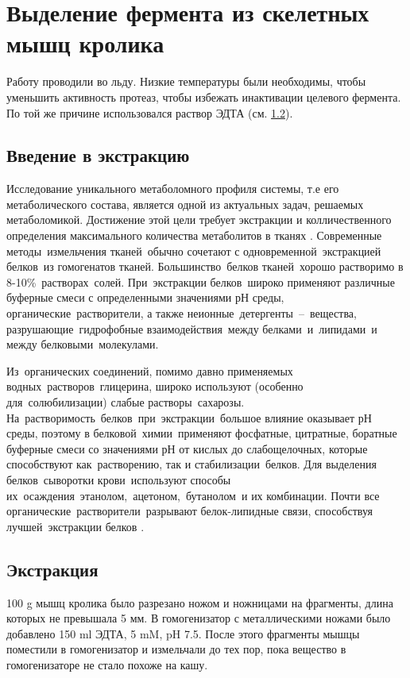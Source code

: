 \section{Выделение фермента из скелетных мышц кролика}
Работу проводили во льду.
Низкие температуры были необходимы, чтобы уменьшить активность протеаз,
чтобы избежать инактивации целевого фермента.
По той же причине использовался раствор ЭДТА (см. \ref{extr}).

\subsection{Введение в экстракцию}
Исследование уникального метаболомного профиля системы, т.е его метаболического состава, является одной из
актуальных задач, решаемых метаболомикой.
Достижение этой цели требует экстракции и колличественного определения максимального количества
метаболитов в тканях \cite{kursovaya-garika}.
Современные методы измельчения тканей обычно сочетают с одновременной экстракцией белков из гомогенатов
тканей.
Большинство белков тканей хорошо растворимо в 8-10\% растворах солей.
При экстракции белков широко применяют различные буферные смеси с определенными значениями рН среды,
органические растворители, а также неионные детергенты -- вещества, разрушающие гидрофобные
взаимодействия между белками и липидами и между белковыми молекулами.

Из органических соединений, помимо давно применяемых водных растворов глицерина, широко используют
(особенно для солюбилизации) слабые растворы сахарозы.
На растворимость белков при экстракции большое влияние оказывает рН среды, поэтому в
белковой химии применяют фосфатные, цитратные, боратные буферные смеси со значениями рН от кислых до
слабощелочных, которые способствуют как растворению, так и стабилизации белков.
Для выделения белков сыворотки крови используют способы их осаждения этанолом, ацетоном, бутанолом и их
комбинации.
Почти все органические растворители разрывают белок-липидные связи, способствуя лучшей экстракции
белков \cite{berezov}.

\subsection{Экстракция}
\label{extr}
100 g мышц кролика было разрезано ножом и ножницами на фрагменты,
длина которых не превышала 5 мм.
В гомогенизатор с металлическими ножами было добавлено 150 ml ЭДТА, 5 mM, pH 7.5.
После этого фрагменты мышцы поместили в гомогенизатор и измельчали до тех пор,
пока вещество в гомогенизаторе не стало похоже на кашу.

